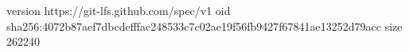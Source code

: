 version https://git-lfs.github.com/spec/v1
oid sha256:4072b87aef7dbcdefffac248533c7c02ae19f56fb9427f67841ae13252d79acc
size 262240
